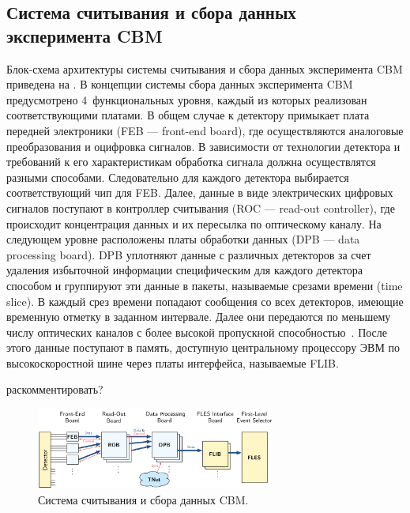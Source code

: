 \subsection{Система считывания и сбора данных эксперимента CBM}\label{sec:CBMreadout}

Блок-схема архитектуры системы считывания и сбора данных эксперимента CBM приведена на .
В концепции системы сбора данных эксперимента CBM предусмотрено 4~функциональных уровня, каждый из которых реализован соответствующими платами. В общем случае к детектору примыкает плата передней электроники (FEB --- front-end board), где осуществляются аналоговые преобразования и оцифровка сигналов.
В зависимости от технологии детектора и требований к его характеристикам обработка сигнала должна осуществлятся разными способами. Следовательно для каждого детектора выбирается соответствующий чип для FEB.
Далее, данные в виде электрических цифровых сигналов поступают в контроллер считывания (ROC --- read-out controller), где происходит концентрация данных и их пересылка по оптическому каналу. На следующем уровне расположены платы обработки данных (DPB --- data processing board). DPB уплотняют данные с различных детекторов за счет удаления избыточной информации специфическим для каждого детектора способом и группируют эти данные в пакеты, называемые срезами времени (time slice). В каждый срез времени попадают сообщения со всех детекторов, имеющие временную отметку в заданном интервале. Далее они передаются по меньшему числу оптических каналов с более высокой пропускной способностью~\cite{DPB}. После этого данные поступают в память, доступную центральному процессору ЭВМ по высокоскоростной шине через платы интерфейса, называемые FLIB.

\todo раскомментировать?

\begin{figure}[H]
\centering
\includegraphics[width=0.7\textwidth]{pictures/CBMreadout.png}
\caption{Система считывания и сбора данных CBM.}
\label{fig:CBMreadout}
\end{figure}

